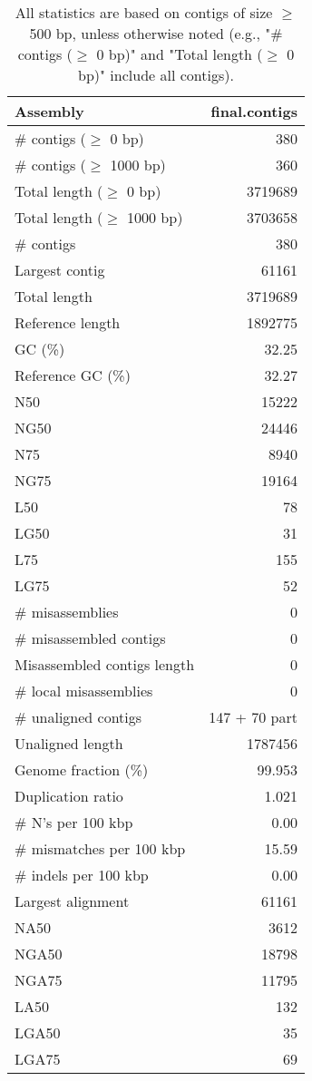 \documentclass[12pt,a4paper]{article}
\begin{document}
\begin{table}[ht]
\begin{center}
\caption{All statistics are based on contigs of size $\geq$ 500 bp, unless otherwise noted (e.g., "\# contigs ($\geq$ 0 bp)" and "Total length ($\geq$ 0 bp)" include all contigs).}
\begin{tabular}{|l*{1}{|r}|}
\hline
Assembly & final.contigs \\ \hline
\# contigs ($\geq$ 0 bp) & 380 \\ \hline
\# contigs ($\geq$ 1000 bp) & 360 \\ \hline
Total length ($\geq$ 0 bp) & 3719689 \\ \hline
Total length ($\geq$ 1000 bp) & 3703658 \\ \hline
\# contigs & 380 \\ \hline
Largest contig & 61161 \\ \hline
Total length & 3719689 \\ \hline
Reference length & 1892775 \\ \hline
GC (\%) & 32.25 \\ \hline
Reference GC (\%) & 32.27 \\ \hline
N50 & 15222 \\ \hline
NG50 & 24446 \\ \hline
N75 & 8940 \\ \hline
NG75 & 19164 \\ \hline
L50 & 78 \\ \hline
LG50 & 31 \\ \hline
L75 & 155 \\ \hline
LG75 & 52 \\ \hline
\# misassemblies & 0 \\ \hline
\# misassembled contigs & 0 \\ \hline
Misassembled contigs length & 0 \\ \hline
\# local misassemblies & 0 \\ \hline
\# unaligned contigs & 147 + 70 part \\ \hline
Unaligned length & 1787456 \\ \hline
Genome fraction (\%) & 99.953 \\ \hline
Duplication ratio & 1.021 \\ \hline
\# N's per 100 kbp & 0.00 \\ \hline
\# mismatches per 100 kbp & 15.59 \\ \hline
\# indels per 100 kbp & 0.00 \\ \hline
Largest alignment & 61161 \\ \hline
NA50 & 3612 \\ \hline
NGA50 & 18798 \\ \hline
NGA75 & 11795 \\ \hline
LA50 & 132 \\ \hline
LGA50 & 35 \\ \hline
LGA75 & 69 \\ \hline
\end{tabular}
\end{center}
\end{table}
\end{document}
